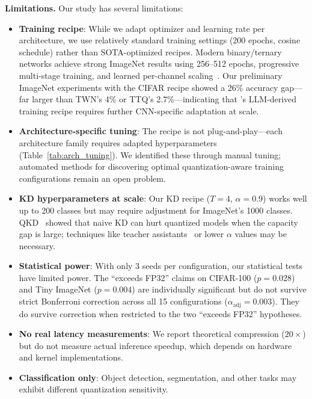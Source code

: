 \documentclass[10pt]{article}
\begin{document}
\textbf{Limitations.}
Our study has several limitations:
\begin{itemize}
    \item \textbf{Training recipe}: While we adapt optimizer and learning rate per architecture, we use relatively standard training settings (200 epochs, cosine schedule) rather than SOTA-optimized recipes. Modern binary/ternary networks achieve strong ImageNet results using 256--512 epochs, progressive multi-stage training, and learned per-channel scaling~\cite{liu2020reactnet,martinez2020real2binary}. Our preliminary ImageNet experiments with the CIFAR recipe showed a 26\% accuracy gap---far larger than TWN's 4\% or TTQ's 2.7\%---indicating that \bitnetb{}'s LLM-derived training recipe requires further CNN-specific adaptation at scale.
    \item \textbf{Architecture-specific tuning}: The recipe is not plug-and-play---each architecture family requires adapted hyperparameters (Table~\ref{tab:arch_tuning}). We identified these through manual tuning; automated methods for discovering optimal quantization-aware training configurations remain an open problem.
    \item \textbf{KD hyperparameters at scale}: Our KD recipe ($T=4$, $\alpha=0.9$) works well up to 200 classes but may require adjustment for ImageNet's 1000 classes. QKD~\cite{kim2019qkd} showed that naive KD can hurt quantized models when the capacity gap is large; techniques like teacher assistants~\cite{mirzadeh2020teacher} or lower $\alpha$ values may be necessary.
    \item \textbf{Statistical power}: With only 3 seeds per configuration, our statistical tests have limited power. The ``exceeds FP32'' claims on CIFAR-100 ($p=0.028$) and Tiny ImageNet ($p=0.004$) are individually significant but do not survive strict Bonferroni correction across all 15 configurations ($\alpha_{\text{adj}}=0.003$). They do survive correction when restricted to the two ``exceeds FP32'' hypotheses.
    \item \textbf{No real latency measurements}: We report theoretical compression ($20\times$) but do not measure actual inference speedup, which depends on hardware and kernel implementations.
    \item \textbf{Classification only}: Object detection, segmentation, and other tasks may exhibit different quantization sensitivity.
\end{itemize}

\end{document}
